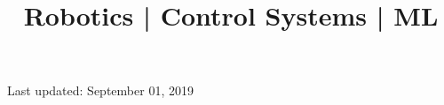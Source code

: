 \documentclass[10pt,a4paper]{moderncv}
\title{Robotics | Control Systems  | ML
	\newline
	\bf{\lb{\footnotesize
			Rerum Cognoscere Causas: To know the causes of things.} }}
\begin{document}
	\makecvtitle
	
	
	
	
	
	
	
	
	
	
	
	
%
	\footnotesize \centering Last updated: September 01, 2019
\clearpage
\end{document}
